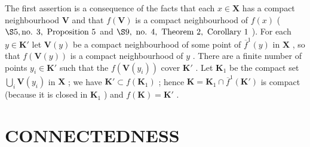 The first assertion is a consequence of the facts that each \(x \in \mathbf{X}\) has a compact neighbourhood \(\mathbf{V}\) and that \(f(\mathbf{V})\) is a compact neighbourhood of \(f(x)\) ( \(\S 5, \text{no. } 3, \text{ Proposition } 5\) and \(\S 9, \text{ no. } 4, \text{ Theorem } 2, \text{ Corollary } 1\) ). For each \(y \in \mathbf{K}'\) let \(\mathbf{V}(y)\) be a compact neighbourhood of some point of \(\overline{f}^1(y)\) in \(\mathbf{X}\) , so that \(f(\mathbf{V}(y))\) is a compact neighbourhood of \(y\) . There are a finite number of points \(y_i \in \mathbf{K}'\) such that the \(f(\mathbf{V}(y_i))\) cover \(\mathbf{K}'\) . Let \(\mathbf{K}_1\) be the compact set \(\bigcup_i \mathbf{V}(y_i)\) in \(\mathbf{X}\) ; we have \(\mathbf{K}' \subset f(\mathbf{K}_1)\) ; hence \(\mathbf{K} = \mathbf{K}_1 \cap \overline{f}^1(\mathbf{K}')\) is compact (because it is closed in \(\mathbf{K}_1\) ) and \(f(\mathbf{K}) = \mathbf{K}'\) .

\section{CONNECTEDNESS}
